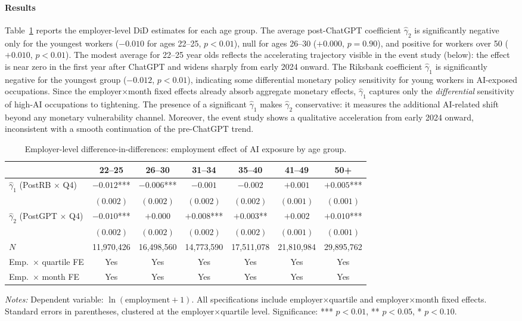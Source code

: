 \documentclass[preprint,12pt,authoryear]{elsarticle}
\begin{document}
\paragraph{Results}
Table~\ref{tab:employer_did} reports the employer-level DiD estimates for each age group. The average post-ChatGPT coefficient $\hat\gamma_2$ is significantly negative only for the youngest workers ($-0.010$ for ages 22--25, $p < 0.01$), null for ages 26--30 ($+0.000$, $p = 0.90$), and positive for workers over 50 ($+0.010$, $p < 0.01$). The modest average for 22--25 year olds reflects the accelerating trajectory visible in the event study (below): the effect is near zero in the first year after ChatGPT and widens sharply from early 2024 onward. The Riksbank coefficient $\hat\gamma_1$ is significantly negative for the youngest group ($-0.012$, $p < 0.01$), indicating some differential monetary policy sensitivity for young workers in AI-exposed occupations. Since the employer$\times$month fixed effects already absorb aggregate monetary effects, $\hat\gamma_1$ captures only the \emph{differential} sensitivity of high-AI occupations to tightening. The presence of a significant $\hat\gamma_1$ makes $\hat\gamma_2$ conservative: it measures the additional AI-related shift beyond any monetary vulnerability channel. Moreover, the event study shows a qualitative acceleration from early 2024 onward, inconsistent with a smooth continuation of the pre-ChatGPT trend.

\begin{table}[htbp]
\centering
\caption{Employer-level difference-in-differences: employment effect of AI exposure by age group.}
\label{tab:employer_did}
\footnotesize
\begin{tabular}{@{}lcccccc@{}}
\toprule
 & 22--25 & 26--30 & 31--34 & 35--40 & 41--49 & 50+ \\
\midrule
$\hat\gamma_1$ (PostRB $\times$ Q4) & $-0.012$*** & $-0.006$*** & $-0.001$ & $-0.002$ & $+0.001$ & $+0.005$*** \\
 & $(0.002)$ & $(0.002)$ & $(0.002)$ & $(0.002)$ & $(0.001)$ & $(0.001)$ \\[4pt]
$\hat\gamma_2$ (PostGPT $\times$ Q4) & $-0.010$*** & $+0.000$ & $+0.008$*** & $+0.003$** & $+0.002$ & $+0.010$*** \\
 & $(0.002)$ & $(0.002)$ & $(0.002)$ & $(0.002)$ & $(0.001)$ & $(0.001)$ \\[4pt]
$N$ & 11,970,426 & 16,498,560 & 14,773,590 & 17,511,078 & 21,810,984 & 29,895,762 \\
\midrule
Emp.\ $\times$ quartile FE & Yes & Yes & Yes & Yes & Yes & Yes \\
Emp.\ $\times$ month FE & Yes & Yes & Yes & Yes & Yes & Yes \\
\bottomrule
\end{tabular}
\par\medskip
\noindent\parbox{\linewidth}{\raggedright\scriptsize \emph{Notes:} Dependent variable: $\ln(\text{employment} + 1)$. All specifications include employer$\times$quartile and employer$\times$month fixed effects. Standard errors in parentheses, clustered at the employer$\times$quartile level. Significance: *** $p<0.01$, ** $p<0.05$, * $p<0.10$.}

\end{table}
\end{document}
